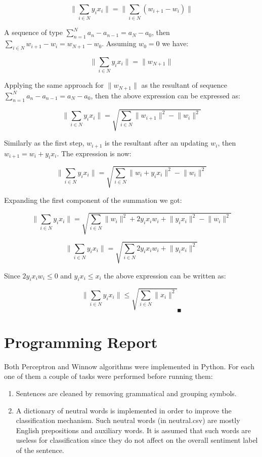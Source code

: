 \documentclass[11pt]{article}
\begin{document}
$$\lVert \sum_{i \in N} y_ix_i \rVert = \lVert \sum_{i \in N} (w_{i+1}-w_i) \rVert$$

A sequence of type $\sum_{n=1}^{N}a_n-a_{n-1} = a_N-a_0$, then $\sum_{i \in N} w_{i+1}-w_i = w_{N+1}-w_0$. Assuming $w_0=0$ we have:

$$\lVert \sum_{i \in N} y_ix_i \rVert = \lVert w_{N+1} \rVert$$

Applying the same approach for $\lVert w_{N+1} \rVert$ as the resultant of sequence $\sum_{n=1}^{N}a_n-a_{n-1} = a_N-a_0$, then the above expression can be expressed as:

$$\lVert \sum_{i \in N} y_ix_i \rVert = \sqrt{\sum_{i \in N} \lVert w_{i+1} \rVert ^ 2 - \lVert w_i \rVert ^ 2}$$

Similarly as the first step, $w_{i+1}$ is the resultant after an updating $w_i$, then $w_{i+1}=w_{i} + y_ix_i$. The expression is now:

$$\lVert \sum_{i \in N} y_ix_i \rVert = \sqrt{\sum_{i \in N} \lVert w_{i} + y_ix_i \rVert ^ 2 - \lVert w_i \rVert ^ 2}$$

Expanding the first component of the summation we got:

$$\lVert \sum_{i \in N} y_ix_i \rVert = \sqrt{\sum_{i \in N} \lVert w_{i} \rVert ^ 2 +  2y_ix_iw_i + \lVert y_ix_i \rVert ^ 2 - \lVert w_i \rVert ^ 2}$$

$$\lVert \sum_{i \in N} y_ix_i \rVert = \sqrt{\sum_{i \in N} 2y_ix_iw_i + \lVert y_ix_i \rVert ^ 2}$$

Since $2y_ix_iw_i \leq 0$ and $y_ix_i \leq x_i$ the above expression can be written as:

$$\lVert \sum_{i \in N} y_ix_i \rVert \leq \sqrt{\sum_{i \in N} \lVert x_i \rVert ^ 2}_\blacksquare$$


\section{Programming Report}

Both Perceptron and Winnow algorithms were implemented in Python.  For each one of them a couple of tasks were performed before running them:

\begin{enumerate}
\item Sentences are cleaned by removing grammatical and grouping symbols.
\item A dictionary of neutral words is implemented in order to improve the classification mechanism. Such neutral words (in neutral.csv) are mostly English prepositions and auxiliary words. It is assumed that such words are useless for classification since they do not affect on the overall sentiment label of the sentence.
\end{enumerate}
\end{document}

